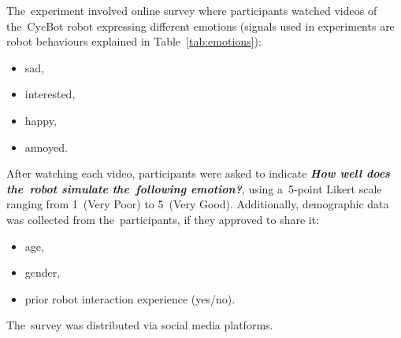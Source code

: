 \par The~experiment involved online survey where participants watched videos of the~CycBot robot expressing different emotions (signals used in experiments are robot behaviours explained in Table~\ref{tab:emotions}):
\begin{itemize}
    \item sad,
    \item interested,
    \item happy,
    \item annoyed.
\end{itemize}
After watching each video, participants were asked to indicate \textbf{\textit{How well does the~robot simulate the~following emotion?}}, using a~5-point Likert scale ranging from 1~(Very Poor) to 5~(Very Good). Additionally, demographic data was collected from the~participants, if they approved to share it:
\begin{itemize}
    \item age,
    \item gender,
    \item prior robot interaction experience (yes/no).
\end{itemize}
The~survey was distributed via social media platforms.

